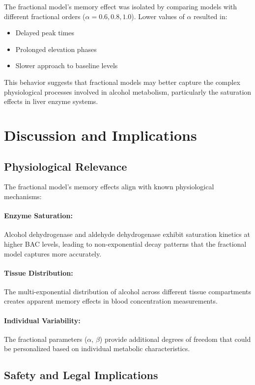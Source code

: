 \documentclass[12pt]{article}
\begin{document}
The fractional model's memory effect was isolated by comparing models with different fractional orders ($\alpha = 0.6, 0.8, 1.0$). Lower values of $\alpha$ resulted in:
\begin{itemize}
    \item Delayed peak times
    \item Prolonged elevation phases
    \item Slower approach to baseline levels
\end{itemize}

This behavior suggests that fractional models may better capture the complex physiological processes involved in alcohol metabolism, particularly the saturation effects in liver enzyme systems.

\section{Discussion and Implications}

\subsection{Physiological Relevance}

The fractional model's memory effects align with known physiological mechanisms:

\paragraph{Enzyme Saturation:} Alcohol dehydrogenase and aldehyde dehydrogenase exhibit saturation kinetics at higher BAC levels, leading to non-exponential decay patterns that the fractional model captures more accurately.

\paragraph{Tissue Distribution:} The multi-exponential distribution of alcohol across different tissue compartments creates apparent memory effects in blood concentration measurements.

\paragraph{Individual Variability:} The fractional parameters ($\alpha$, $\beta$) provide additional degrees of freedom that could be personalized based on individual metabolic characteristics.

\subsection{Safety and Legal Implications}
\end{document}
